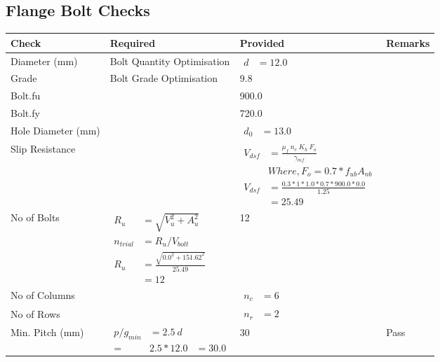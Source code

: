 \documentclass{article}%
\begin{document}
\subsection{Flange Bolt Checks}%
\label{subsec:FlangeBoltChecks}%
\renewcommand{\arraystretch}{1.2}%
\begin{longtable}{|p{4cm}|p{5cm}|p{5.5cm}|p{1.5cm}|}%
\hline%
\rowcolor{OsdagGreen}%
Check&Required&Provided&Remarks\\%
\hline%
\endhead%
\hline%
Diameter (mm)&Bolt Quantity Optimisation&$\begin{aligned} d &=12.0\end{aligned}$&\\%
\hline%
Grade&Bolt Grade Optimisation&9.8&\\%
\hline%
Bolt.fu&&900.0&\\%
\hline%
Bolt.fy&&720.0&\\%
\hline%
Hole Diameter (mm)& &$\begin{aligned} d_0 &=13.0\end{aligned}$&\\%
\hline%
Slip Resistance&&$\begin{aligned}V_{dsf} & = \frac{\mu_f~ n_e~  K_h~ F_o}{\gamma_{mf}}\\ & Where, F_o = 0.7 * f_{ub} A_{nb}\\ V_{dsf} & = \frac{0.3*1*1.0* 0.7 *900.0*0.0}{1.25}\\ & =25.49\end{aligned}$&\\%
\hline%
No of Bolts&$\begin{aligned}R_{u} &= \sqrt{V_u^2+A_u^2}\\ n_{trial} &= R_u/ V_{bolt}\\ R_{u} &= \frac{\sqrt{0.0^2+151.62^2}}{25.49}\\ &=12\end{aligned}$&12&\\%
\hline%
No of Columns&&$\begin{aligned} n_c &=6\end{aligned}$&\\%
\hline%
No of Rows&&$\begin{aligned} n_r &=2\end{aligned}$&\\%
\hline%
Min. Pitch (mm)&$\begin{aligned}p/g_{min}&= 2.5 ~ d&\\ =&2.5*12.0&=30.0\end{aligned}$&30&Pass\\%

\end{longtable}
\end{document}
